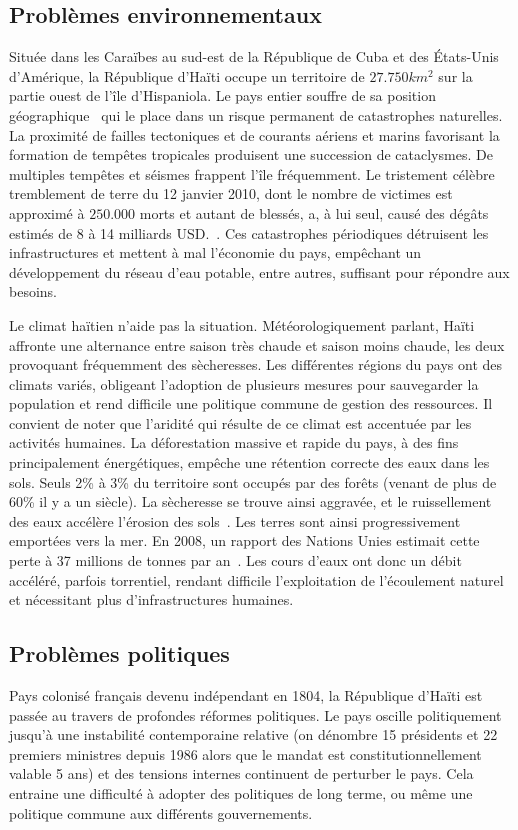 \documentclass{eplmastersthesis_FR}
\begin{document}
			\subsection*{Problèmes environnementaux}
				Située dans les Caraïbes au sud-est de la République de Cuba et des \'Etats-Unis d'Amérique, la République d'Haïti occupe un territoire de $27.750km^{2}$ sur la partie ouest de l'île d'Hispaniola. Le pays entier souffre de sa position géographique~\cite{ref:regards_situation_eau_haiti} qui le place dans un risque permanent de catastrophes naturelles. La proximité de failles tectoniques et de courants aériens et marins favorisant la formation de tempêtes tropicales produisent une succession de cataclysmes. De multiples tempêtes et séismes frappent l'île fréquemment. Le tristement célèbre tremblement de terre du 12 janvier 2010, dont le nombre de victimes est approximé à $250.000$ morts et autant de blessés, a, à lui seul, causé des dégâts estimés de 8 à 14 milliards USD.~\cite{ref:estimating_economic_damage_earthquake_haiti}. Ces catastrophes périodiques détruisent les infrastructures et mettent à mal l'économie du pays, empêchant un développement du réseau d'eau potable, entre autres, suffisant pour répondre aux besoins.

				Le climat haïtien n'aide pas la situation. Météorologiquement parlant, Haïti affronte une alternance entre saison très chaude et saison moins chaude, les deux provoquant fréquemment des sècheresses. Les différentes régions du pays ont des climats variés, obligeant l'adoption de plusieurs mesures pour sauvegarder la population et rend difficile une politique commune de gestion des ressources. Il convient de noter que l'aridité qui résulte de ce climat est accentuée par les activités humaines. La déforestation massive et rapide du pays, à des fins principalement énergétiques, empêche une rétention correcte des eaux dans les sols. Seuls 2\% à 3\% du territoire sont occupés par des forêts (venant de plus de 60\% il y a un siècle). La sècheresse se trouve ainsi aggravée, et le ruissellement des eaux accélère l'érosion des sols~\cite{ref:desertification_of_haiti}. Les terres sont ainsi progressivement emportées vers la mer. En 2008, un rapport des Nations Unies estimait cette perte à 37 millions de tonnes par an~\cite{ref:impact_degradation_terre}. Les cours d'eaux ont donc un débit accéléré, parfois torrentiel, rendant difficile l'exploitation de l'écoulement naturel et nécessitant plus d'infrastructures humaines.

			\subsection*{Problèmes politiques}
				Pays colonisé français devenu indépendant en 1804, la République d'Haïti est passée au travers de profondes réformes politiques. Le pays oscille politiquement jusqu'à une instabilité contemporaine relative (on dénombre 15 présidents et 22 premiers ministres depuis 1986 alors que le mandat est constitutionnellement valable 5 ans) et des tensions internes continuent de perturber le pays. Cela entraine une difficulté à adopter des politiques de long terme, ou même une politique commune aux différents gouvernements.
\end{document}
